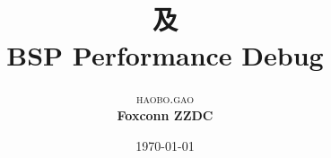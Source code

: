 \documentclass [a4paper,12pt,oneside] {report}
\begin{document}
\title{\textbf{ }\\ %
及 \\BSP Performance Debug} %

\author{\textsc{haobo.gao} %
\\{\textbf{Foxconn ZZDC}}} %

\date{\today} %
\maketitle






\end{document}
